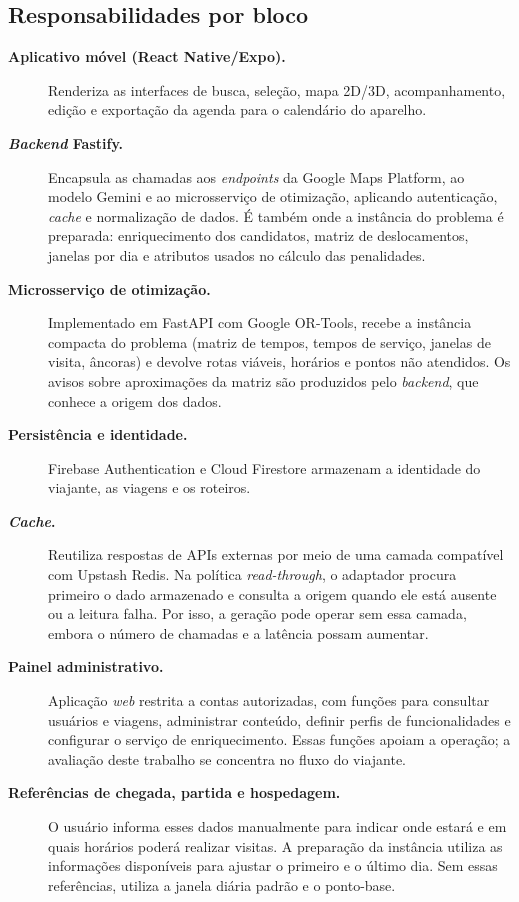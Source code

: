 \subsection{Responsabilidades por bloco}
\begin{description}
  \item[\textbf{Aplicativo móvel (React Native/Expo).}] Renderiza as interfaces de busca, seleção, mapa 2D/3D, acompanhamento, edição e exportação da agenda para o calendário do aparelho.
  \item[\textbf{\textit{Backend} Fastify.}] Encapsula as chamadas aos \textit{endpoints} da Google Maps Platform, ao modelo Gemini e ao microsserviço de otimização, aplicando autenticação, \textit{cache} e normalização de dados. É também onde a instância do problema é preparada: enriquecimento dos candidatos, matriz de deslocamentos, janelas por dia e atributos usados no cálculo das penalidades.
  \item[\textbf{Microsserviço de otimização.}] Implementado em FastAPI com Google OR-Tools, recebe a instância compacta do problema (matriz de tempos, tempos de serviço, janelas de visita, âncoras) e devolve rotas viáveis, horários e pontos não atendidos. Os avisos sobre aproximações da matriz são produzidos pelo \textit{backend}, que conhece a origem dos dados.
  \item[\textbf{Persistência e identidade.}] Firebase Authentication e Cloud Firestore armazenam a identidade do viajante, as viagens e os roteiros.
  \item[\textbf{\textit{Cache}.}] Reutiliza respostas de APIs externas por meio de uma camada compatível com Upstash Redis. Na política \textit{read-through}, o adaptador procura primeiro o dado armazenado e consulta a origem quando ele está ausente ou a leitura falha. Por isso, a geração pode operar sem essa camada, embora o número de chamadas e a latência possam aumentar.
  \item[\textbf{Painel administrativo.}] Aplicação \textit{web} restrita a contas autorizadas, com funções para consultar usuários e viagens, administrar conteúdo, definir perfis de funcionalidades e configurar o serviço de enriquecimento. Essas funções apoiam a operação; a avaliação deste trabalho se concentra no fluxo do viajante.
  \item[\textbf{Referências de chegada, partida e hospedagem.}] O usuário informa esses dados manualmente para indicar onde estará e em quais horários poderá realizar visitas. A preparação da instância utiliza as informações disponíveis para ajustar o primeiro e o último dia. Sem essas referências, utiliza a janela diária padrão e o ponto-base.
\end{description}

